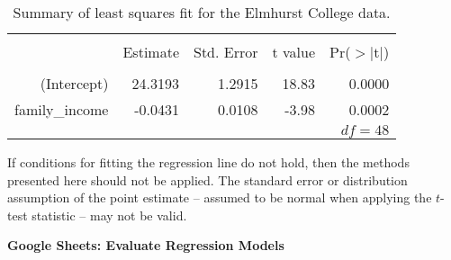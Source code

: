 \begin{table}[ht]
\centering
\begin{tabular}{rrrrr}
  \hline
  \vspace{-3.7mm} & & & & \\
 & Estimate & Std. Error & t value & Pr($>$$|$t$|$) \\ 
  \hline
  \vspace{-3.6mm} & & & & \\
(Intercept) & 24.3193 & 1.2915 & 18.83 & 0.0000 \\ 
family\_\hspace{0.3mm}income & -0.0431 & 0.0108 & -3.98 & 0.0002 \\ 
   \hline
   \multicolumn{5}{r}{$df=48$} \\
\end{tabular}
\caption{Summary of least squares fit for the Elmhurst College data.}
\label{rOutputForIncomeAidLSRLineInInferenceSection}
\end{table}

\begin{tipBox}{
If conditions for fitting the regression line do not hold, then the methods presented here should not be applied. The standard error or distribution assumption of the point estimate -- assumed to be normal when applying the $t$-test statistic -- may not be valid.}
\end{tipBox}


\noindent\Large{\textbf{ {\color{ForestGreen} Google Sheets: Evaluate Regression Models}}}
\normalsize



